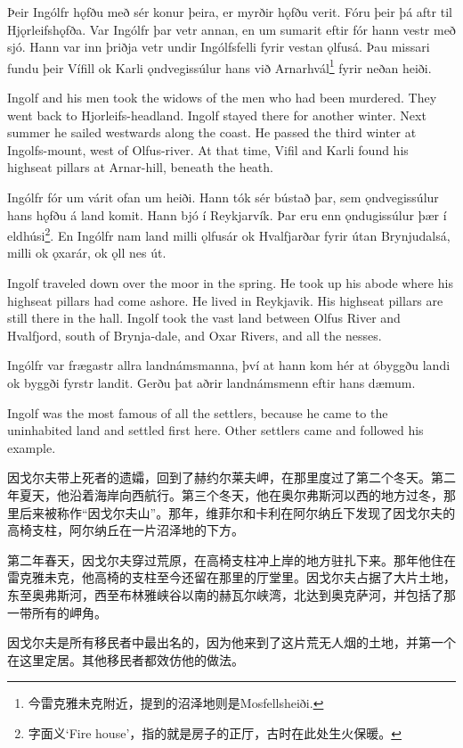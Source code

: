 \begin{paracol}{2}
    Þeir Ingólfr hǫfðu með sér konur þeira, er myrðir hǫfðu verit. Fóru þeir þá aftr til Hjǫrleifshǫfða. Var Ingólfr þar vetr annan, en um sumarit eftir fór hann vestr með sjó. Hann var inn þriðja vetr undir Ingólfsfelli fyrir vestan ǫlfusá. Þau missari fundu þeir Vífill ok Karli ǫndvegissúlur hans við Arnarhvál\footnote{今雷克雅未克附近，提到的沼泽地则是Mosfellsheiði.} fyrir neðan heiði.

    \switchcolumn

    Ingolf and his men took the widows of the men who had been murdered. They went back to Hjorleifs-headland. Ingolf stayed there for another winter. Next summer he sailed westwards along the coast. He passed the third winter at Ingolfs-mount, west of Olfus-river. At that time, Vifil and Karli found his highseat pillars at Arnar-hill, beneath the heath.

    \switchcolumn*

    Ingólfr fór um várit ofan um heiði. Hann tók sér bústað þar, sem ǫndvegissúlur hans hǫfðu á land komit. Hann bjó í Reykjarvík. Þar eru enn ǫndugissúlur þær í eldhúsi\footnote{字面义`Fire house'，指的就是房子的正厅，古时在此处生火保暖。}. En Ingólfr nam land milli ǫlfusár ok Hvalfjarðar fyrir útan Brynjudalsá, milli ok ǫxarár, ok ǫll nes út.

    \switchcolumn

    Ingolf traveled down over the moor in the spring. He took up his abode where his highseat pillars had come ashore. He lived in Reykjavik. His highseat pillars are still there in the hall. Ingolf took the vast land between Olfus River and Hvalfjord, south of Brynja-dale, and Oxar Rivers, and all the nesses.

    \switchcolumn*

    Ingólfr var frægastr allra landnámsmanna, því at hann kom hér at óbyggðu landi ok byggði fyrstr landit. Gerðu þat aðrir landnámsmenn eftir hans dæmum.

    \switchcolumn

    Ingolf was the most famous of all the settlers, because he came to the uninhabited land and settled first here. Other settlers came and followed his example.
\end{paracol}
\begin{translation*}{}
    因戈尔夫带上死者的遗孀，回到了赫约尔莱夫岬，在那里度过了第二个冬天。第二年夏天，他沿着海岸向西航行。第三个冬天，他在奥尔弗斯河以西的地方过冬，那里后来被称作“因戈尔夫山”。那年，维菲尔和卡利在阿尔纳丘下发现了因戈尔夫的高椅支柱，阿尔纳丘在一片沼泽地的下方。

    第二年春天，因戈尔夫穿过荒原，在高椅支柱冲上岸的地方驻扎下来。那年他住在雷克雅未克，他高椅的支柱至今还留在那里的厅堂里。因戈尔夫占据了大片土地，东至奥弗斯河，西至布林雅峡谷以南的赫瓦尔峡湾，北达到奥克萨河，并包括了那一带所有的岬角。

    因戈尔夫是所有移民者中最出名的，因为他来到了这片荒无人烟的土地，并第一个在这里定居。其他移民者都效仿他的做法。
\end{translation*}

